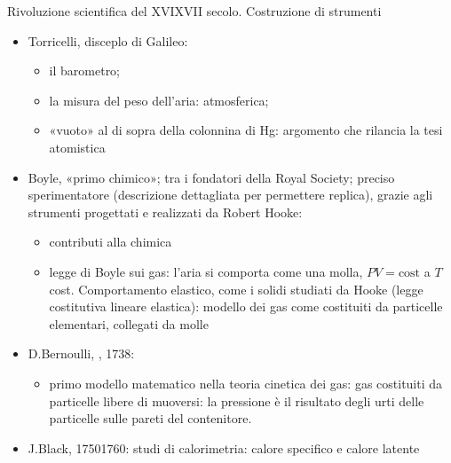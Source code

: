 \documentclass[letterpaper,10pt,italian]{jupyterBook}
\begin{document}
\sphinxAtStartPar
{} Rivoluzione scientifica del XVI\sphinxhyphen{}XVII secolo. Costruzione di strumenti
\begin{itemize}
\item {} 
\sphinxAtStartPar
Torricelli, disceplo di Galileo:
\begin{itemize}
\item {} 
\sphinxAtStartPar
il barometro;

\item {} 
\sphinxAtStartPar
la misura del peso dell’aria:  atmosferica;

\item {} 
\sphinxAtStartPar
«vuoto» al di sopra della colonnina di Hg: argomento che rilancia la tesi atomistica

\end{itemize}

\item {} 
\sphinxAtStartPar
Boyle, «primo chimico»; tra i fondatori della Royal Society; preciso sperimentatore (descrizione dettagliata per permettere replica), grazie agli strumenti progettati e realizzati da Robert Hooke:
\begin{itemize}
\item {} 
\sphinxAtStartPar
contributi alla chimica

\item {} 
\sphinxAtStartPar
legge di Boyle sui gas: l’aria si comporta come una molla, \(PV = \text{cost}\) a \(T\) cost. Comportamento elastico, come i solidi studiati da Hooke (legge costitutiva lineare elastica): modello dei gas come costituiti da particelle elementari, collegati da molle

\end{itemize}

\item {} 
\sphinxAtStartPar
D.Bernoulli, , 1738:
\begin{itemize}
\item {} 
\sphinxAtStartPar
primo modello matematico nella teoria cinetica dei gas: gas costituiti da particelle libere di muoversi: la pressione è il risultato degli urti delle particelle sulle pareti del contenitore.

\end{itemize}

\item {} 
\sphinxAtStartPar
J.Black, 1750\sphinxhyphen{}1760: studi di calorimetria: calore specifico e calore latente


\end{itemize}
\end{document}
